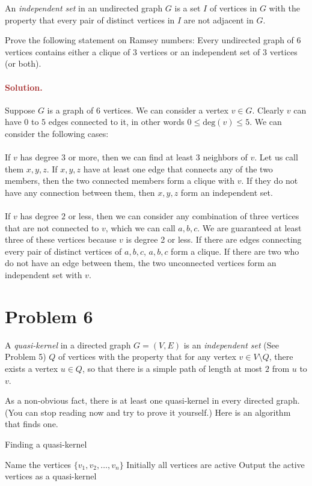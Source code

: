 An \emph{independent set} in an undirected graph $G$ is a set $I$ of vertices in $G$ with the property that every pair of distinct vertices in $I$ are not adjacent in $G$.

Prove the following statement on Ramsey numbers: Every undirected graph of $6$ vertices contains either a clique of $3$ vertices or an independent set of $3$ vertices (or both).

\paragraph{\textcolor{brown}{Solution.}}
Suppose $G$ is a graph of $6$ vertices. We can consider a vertex $v \in G$. Clearly $v$ can have $0$ to $5$ edges connected to it, in other words $0 \leq \text{deg}(v) \leq 5$. We can consider the following cases:\\ \\
If $v$ has degree $3$ or more, then we can find at least 3 neighbors of $v$. Let us call them $x,y,z$. If $x,y,z$ have at least one edge that connects any of the two members, then the two connected members form a clique with $v$. If they do not have any connection between them, then $x,y,z$ form an independent set.\\ \\
If $v$ has degree $2$ or less, then we can consider any combination of three vertices that are not connected to $v$, which we can call $a,b,c$. We are guaranteed at least three of these vertices because $v$ is degree 2 or less. If there are edges connecting every pair of distinct vertices of $a,b,c$, $a,b,c$ form a clique. If there are two who do not have an edge between them, the two unconnected vertices form an independent set with $v$.


\section*{Problem 6}
A \emph{quasi-kernel} in a directed graph $G = (V, E)$ is an \emph{independent set} (See Problem 5) $Q$ of vertices with the property that for any vertex $v \in V \setminus Q$, there exists a vertex $u \in Q$, so that there is a simple path of length at most $2$ from $u$ to $v$.

As a non-obvious fact, there is at least one quasi-kernel in every directed graph. (You can stop reading now and try to prove it yourself.) Here is an algorithm that finds one.

\begin{algorithm}
\caption{Finding a quasi-kernel}
\label{alg:qk}
Name the vertices $\{v_1, v_2, \ldots, v_n\}$\;
Initially all vertices are active\;
Output the active vertices as a quasi-kernel\;
\end{algorithm}

